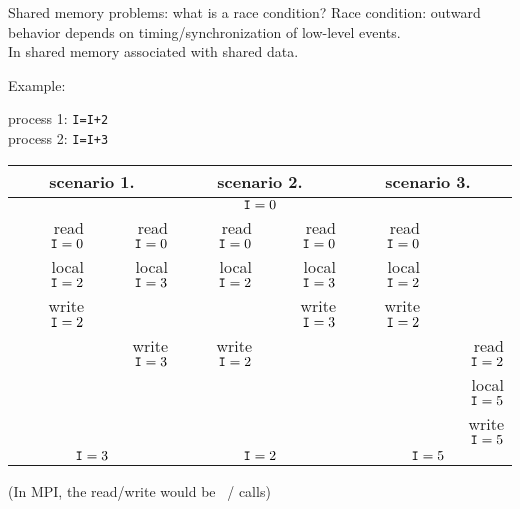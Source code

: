 \begin{numberedframe}{Shared memory problems: what is a race condition?}
  \scriptsize
  Race condition: outward behavior depends on
  timing/synchronization of low-level events.\\
  In shared memory associated with shared data.

  Example:
  \begin{tabbing}
    process 1: \texttt{I=I+2}\\
    process 2: \texttt{I=I+3}
  \end{tabbing}
  \begin{tabular}{|rr|rr|rr|}
    \hline
    \multicolumn{2}{|c|}{scenario 1.}& \multicolumn{2}{|c|}{scenario 2.}&
    \multicolumn{2}{|c|}{scenario 3.}\\ \hline
    \multicolumn{6}{|c|}{$\n{I}=0$}\\ \hline
    read $\n{I}=0$&read $\n{I}=0$&
    read $\n{I}=0$&read $\n{I}=0$&
    read $\n{I}=0$& \\
    local $\n{I}=2$&local $\n{I}=3$& 
    local $\n{I}=2$&local $\n{I}=3$&
    local $\n{I}=2$& \\
    write $\n{I}=2$& & &write $\n{I}=3$&write $\n{I}=2$& \\
    &write $\n{I}=3$&write $\n{I}=2$& & &read $\n{I}=2$\\
    &&&&&local $\n{I}=5$\\
    &&&&&write $\n{I}=5$\\
    \hline
    \multicolumn{2}{|c|}{$\n{I}=3$}& \multicolumn{2}{|c|}{$\n{I}=2$}&
    \multicolumn{2}{|c|}{$\n{I}=5$}\\ \hline
  \end{tabular}

  (In MPI, the read/write would be ~/  calls)
\end{numberedframe}

